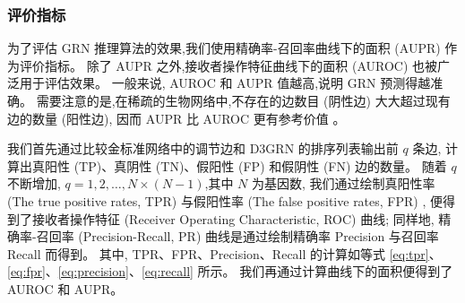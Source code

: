 \begin{table}[!htbp]
\centering
\caption{实验数据集详情}

\label{datasets}
\end{table}

\subsubsection{评价指标}

为了评估 GRN 推理算法的效果,我们使用精确率-召回率曲线下的面积 (AUPR) 作为评价指标。
除了 AUPR 之外,接收者操作特征曲线下的面积 (AUROC) 也被广泛用于评估效果。
一般来说, AUROC 和 AUPR 值越高,说明 GRN 预测得越准确。
需要注意的是,在稀疏的生物网络中,不存在的边数目 (阴性边) 大大超过现有边的数量 (阳性边),
因而 AUPR 比 AUROC 更有参考价值 \cite{saito2015precision} 。

我们首先通过比较金标准网络中的调节边和 D3GRN 的排序列表输出前 $q$ 条边,
计算出真阳性 (TP)、真阴性 (TN)、假阳性 (FP) 和假阴性 (FN) 边的数量。
随着 $q$ 不断增加, $q = 1,2,\ldots,N\times(N-1)$,其中 $N$ 为基因数,
我们通过绘制真阳性率 (The true positive rates, TPR) 与假阳性率 (The false positive rates, FPR) ,
便得到了接收者操作特征 (Receiver Operating Characteristic, ROC) 曲线; 
同样地,
精确率-召回率 (Precision-Recall, PR) 曲线是通过绘制精确率 Precision 与召回率 Recall 而得到。
其中, TPR、FPR、Precision、Recall 的计算如等式 \ref{eq:tpr}、\ref{eq:fpr}、\ref{eq:precision}、\ref{eq:recall} 所示。
我们再通过计算曲线下的面积便得到了 AUROC 和 AUPR。

